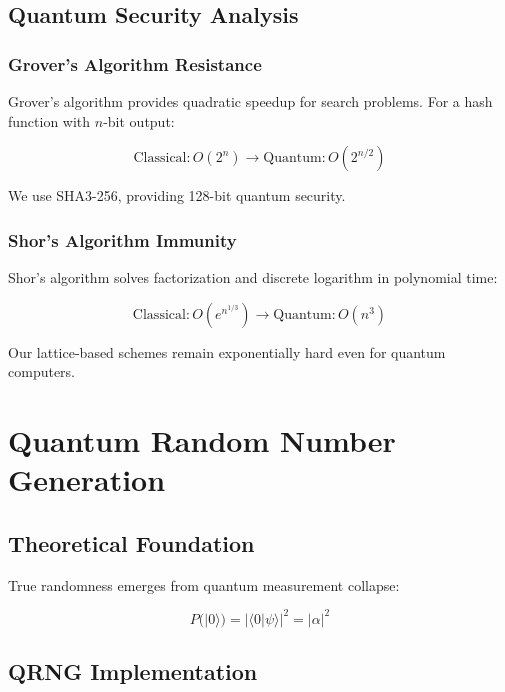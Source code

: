 \documentclass[11pt,a4paper]{article}
\begin{document}
\subsection{Quantum Security Analysis}

\subsubsection{Grover's Algorithm Resistance}

Grover's algorithm provides quadratic speedup for search problems. For a hash function with $n$-bit output:

\begin{equation}
\text{Classical}: O(2^n) \rightarrow \text{Quantum}: O(2^{n/2})
\end{equation}

We use SHA3-256, providing 128-bit quantum security.

\subsubsection{Shor's Algorithm Immunity}

Shor's algorithm solves factorization and discrete logarithm in polynomial time:

\begin{equation}
\text{Classical}: O(e^{n^{1/3}}) \rightarrow \text{Quantum}: O(n^3)
\end{equation}

Our lattice-based schemes remain exponentially hard even for quantum computers.

\section{Quantum Random Number Generation}

\subsection{Theoretical Foundation}

True randomness emerges from quantum measurement collapse:

\begin{equation}
P(|0\rangle) = |\langle 0|\psi\rangle|^2 = |\alpha|^2
\end{equation}

\subsection{QRNG Implementation}
\end{document}
